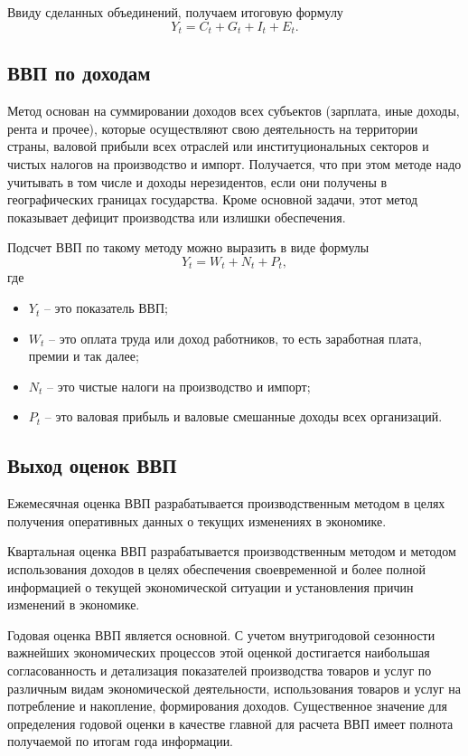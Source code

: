 \documentclass[a4paper, 14pt]{extreport}
\numberwithin{equation}{section}
\numberwithin{equation}{section}
\begin{document}
	Ввиду сделанных объединений, получаем итоговую формулу
	\begin{equation}\label{gdp_exp}
		Y_t = C_t + G_t + I_t + E_t.
	\end{equation}
	\subsection{ВВП по доходам}
	Метод основан на суммировании доходов всех субъектов (зарплата, иные доходы, рента и прочее), которые осуществляют свою деятельность на территории страны, валовой прибыли всех отраслей или институциональных секторов и чистых налогов на производство и импорт. Получается, что при этом методе надо учитывать в том числе и доходы нерезидентов, если они получены в географических границах государства. Кроме основной задачи, этот метод показывает дефицит производства или излишки обеспечения.

	Подсчет ВВП по такому методу можно выразить в виде формулы
	\begin{equation}\label{gdp_inc}
		Y_t = W_t + N_t + P_t,
	\end{equation}
	где
	\begin{itemize}
		\item $Y_t$ -- это показатель ВВП;
		\item $W_t$ -- это оплата труда или доход работников, то есть заработная плата, премии и так далее; 
		\item $N_t$ -- это чистые налоги на производство и импорт;
		\item $P_t$ -- это валовая прибыль и валовые смешанные доходы всех организаций.
	\end{itemize}
	
	\subsection{Выход оценок ВВП}
	
	Ежемесячная оценка ВВП разрабатывается производственным методом в целях получения оперативных данных о текущих изменениях в экономике. 
	
	Квартальная оценка ВВП разрабатывается производственным методом и методом использования доходов в целях обеспечения своевременной и более полной информацией о текущей экономической ситуации и установления причин изменений в экономике.
	
	Годовая оценка ВВП является основной. С учетом внутригодовой сезонности важнейших экономических процессов этой оценкой достигается наибольшая согласованность и детализация показателей производства товаров и услуг по различным видам экономической деятельности, использования товаров и услуг на потребление и накопление, формирования доходов. Существенное значение для определения годовой оценки в качестве главной для расчета ВВП имеет полнота получаемой по итогам года информации.
	
\end{document}
